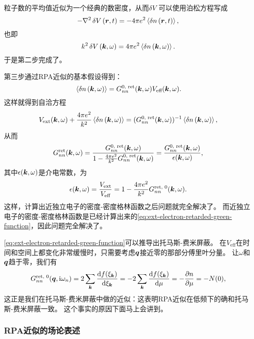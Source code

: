 粒子数的平均值近似为一个经典的数密度，从而$\var{V}$可以使用泊松方程写成
\[
    - \laplacian \var{V}(\vb*{r}, t) = - 4\pi e^2 \expval*{\var{{n}}(\vb*{r}, t)},
\]
也即
\begin{equation}
    k^2 \var{V}(\vb*{k}, \omega) = 4\pi e^2 \expval*{\var{{n}}(\vb*{k}, \omega)}.
\end{equation}
于是第二步完成了。

第三步通过RPA近似的基本假设得到：
\begin{equation}
    \expval*{\var{{n}}(\vb*{k}, \omega)} = G^\text{0, ret}_{nn} (\vb*{k}, \omega) V_\text{eff} (\vb*{k}, \omega).
    \label{eq:rpa-approximation}
\end{equation}
这样就得到自洽方程
\[
    V_\text{ext}(\vb*{k}, \omega) + \frac{4\pi e^2}{k^2} \expval*{\var{{n}}(\vb*{k}, \omega)} = (G^\text{0, ret}_{nn} (\vb*{k}, \omega))^{-1} \expval*{\var{{n}}(\vb*{k}, \omega)},
\]
从而
\begin{equation}
    G^\text{ret}_{nn}(\vb*{k}, \omega) = \frac{G^\text{0, ret}_{nn}(\vb*{k}, \omega)}{1 - \frac{4\pi e^2}{k^2} G^\text{0, ret}_{nn}(\vb*{k}, \omega)} = \frac{G^\text{0, ret}_{nn}(\vb*{k}, \omega)}{\epsilon(\vb*{k}, \omega)},
    \label{eq:ext-electron-ret-nn}
\end{equation}
其中$\epsilon(\vb*{k}, \omega)$是介电常数，为
\begin{equation}
    \epsilon(\vb*{k}, \omega) = \frac{V_\text{ext}}{V_\text{eff}} = 1 - \frac{4 \pi e^2}{k^2} G^\text{ret, 0}_{nn}(\vb*{k}, \omega).
\end{equation}
这样，计算出近独立电子的密度-密度格林函数之后问题就完全解决了。
而近独立电子的密度-密度格林函数是已经计算出来的\eqref{eq:ext-electron-retarded-green-function}，因此问题完全解决了。

\eqref{eq:ext-electron-retarded-green-function}可以推导出托马斯-费米屏蔽。
在$V_\text{eff}$在时间和空间上都变化非常缓慢时，只需要考虑$\vb*{q}$接近零的那部分傅里叶分量。
让$\omega$和$\vb*{q}$趋于零，我们有
\begin{equation}
    G_{nn}^\text{ret, 0}(\vb*{q}, \mathrm{i} \omega_n) = 2 \sum_{\vb*{k}} \dv{f(\xi_{\vb*{k}})}{\xi_{\vb*{k}}} = - 2 \sum_{\vb*{k}} \dv{f(\xi_{\vb*{k}})}{\mu} = - \pdv{n}{\mu} = - N(0),
    \label{eq:back-to-thomas-fermi}
\end{equation}
这正是我们在托马斯-费米屏蔽中做的近似：这表明RPA近似在低频下的确和托马斯-费米屏蔽一致。
这个事实的原因下面马上会讲到。

\subsubsection{RPA近似的场论表述}\label{sec:rpa-field-theory}

